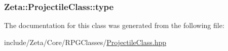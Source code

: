 \hypertarget{classZeta_1_1ProjectileClass_a381e3da4614d6af578994ab37f3c2019}{
\subsubsection[{type}]{ Zeta\+::\+Projectile\+Class\+::type\hspace{0.3cm}{\ttfamily [private]}}}\label{classZeta_1_1ProjectileClass_a381e3da4614d6af578994ab37f3c2019}


The documentation for this class was generated from the following file\+:\begin{DoxyCompactItemize}
\item 
include/\+Zeta/\+Core/\+R\+P\+G\+Classes/\hyperlink{ProjectileClass_8hpp}{Projectile\+Class.\+hpp}\end{DoxyCompactItemize}
